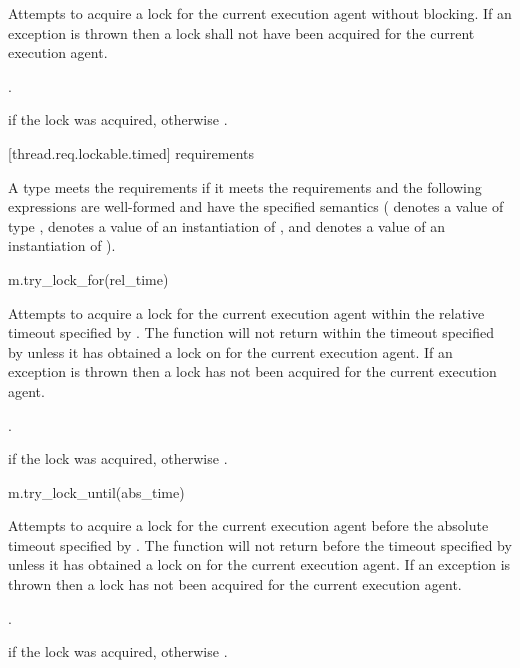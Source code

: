 \begin{itemdescr}
\pnum
\effects
Attempts to acquire a lock for the current execution agent without blocking. If an
exception is thrown then a lock shall not have been acquired for the current execution agent.

\pnum
\returntype {}.

\pnum
\returns
{} if the lock was acquired, otherwise .
\end{itemdescr}

[thread.req.lockable.timed]{ requirements}

\pnum
A type  meets the  requirements if it meets the 
requirements and the following expressions are well-formed and have the specified semantics
( denotes a value of type ,  denotes a value of an
instantiation of , and  denotes a value
of an instantiation of ).

\begin{itemdecl}
m.try_lock_for(rel_time)
\end{itemdecl}

\begin{itemdescr}
\pnum
\effects
Attempts to acquire a lock for the current execution agent within the relative
timeout specified by . The function will not return
within the timeout specified by  unless it has obtained a lock on 
for the current execution agent. If an exception is thrown then a lock has not been
acquired for the current execution agent.

\pnum
\returntype {}.

\pnum
\returns
{} if the lock was acquired, otherwise .
\end{itemdescr}

\begin{itemdecl}
m.try_lock_until(abs_time)
\end{itemdecl}

\begin{itemdescr}
\pnum
\effects
Attempts to acquire a lock for the current execution agent before the absolute
timeout specified by . The function will not return
before the timeout specified by  unless it has obtained a lock on  for
the current execution agent. If an exception is thrown then a lock has not been acquired
for the current execution agent.

\pnum
\returntype {}.

\pnum
\returns
{} if the lock was acquired, otherwise .
\end{itemdescr}

